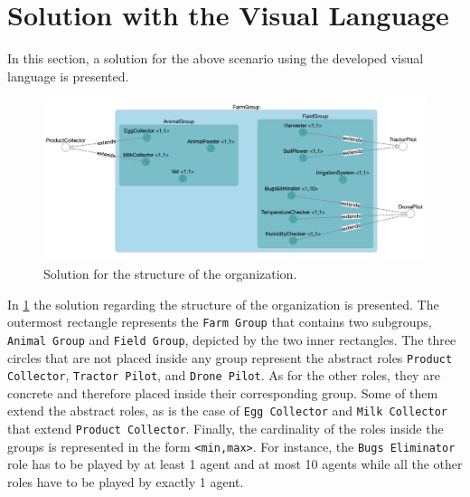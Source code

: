 \section{Solution with the Visual Language}
In this section, a solution for the above scenario using the developed visual language is presented.

\begin{figure}[H]
    \centering
    \includegraphics[width=\textwidth]{images/solution-structural.png}
    \caption{Solution for the structure of the organization.}
    \label{fig:solution-structural}
\end{figure}

In \cref{fig:solution-structural} the solution regarding the structure of the organization is presented.
The outermost rectangle represents the \texttt{Farm Group} that contains two subgroups, \texttt{Animal Group} and \texttt{Field Group}, depicted by the two inner rectangles.
The three circles that are not placed inside any group represent the abstract roles \texttt{Product Collector}, \texttt{Tractor Pilot}, and \texttt{Drone Pilot}.
As for the other roles, they are concrete and therefore placed inside their corresponding group.
Some of them extend the abstract roles, as is the case of \texttt{Egg Collector} and \texttt{Milk Collector} that extend \texttt{Product Collector}.
Finally, the cardinality of the roles inside the groups is represented in the form \texttt{\textless min,max\textgreater}.
For instance, the \texttt{Bugs Eliminator} role has to be played by at least 1 agent and at most 10 agents while all the other roles have to be played by exactly 1 agent.


